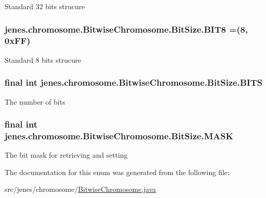 Standard 32 bits strucure \hypertarget{enumjenes_1_1chromosome_1_1_bitwise_chromosome_1_1_bit_size_a3d70a1d66121607b50d32fbf01dd3333}{
\subsubsection[{B\-I\-T8}]{\setlength{\rightskip}{0pt plus 5cm}jenes.\-chromosome.\-Bitwise\-Chromosome.\-Bit\-Size.\-B\-I\-T8 =(8, 0x\-F\-F)}}\label{enumjenes_1_1chromosome_1_1_bitwise_chromosome_1_1_bit_size_a3d70a1d66121607b50d32fbf01dd3333}
Standard 8 bits strucure \hypertarget{enumjenes_1_1chromosome_1_1_bitwise_chromosome_1_1_bit_size_a83754d4cd40d6f7cad7e7732f2494926}{
\subsubsection[{B\-I\-T\-S}]{\setlength{\rightskip}{0pt plus 5cm}final int jenes.\-chromosome.\-Bitwise\-Chromosome.\-Bit\-Size.\-B\-I\-T\-S}}\label{enumjenes_1_1chromosome_1_1_bitwise_chromosome_1_1_bit_size_a83754d4cd40d6f7cad7e7732f2494926}
The number of bits \hypertarget{enumjenes_1_1chromosome_1_1_bitwise_chromosome_1_1_bit_size_a9566045bf22bb46793d909d09f69664b}{
\subsubsection[{M\-A\-S\-K}]{\setlength{\rightskip}{0pt plus 5cm}final int jenes.\-chromosome.\-Bitwise\-Chromosome.\-Bit\-Size.\-M\-A\-S\-K}}\label{enumjenes_1_1chromosome_1_1_bitwise_chromosome_1_1_bit_size_a9566045bf22bb46793d909d09f69664b}
The bit mask for retrieving and setting 

The documentation for this enum was generated from the following file\-:\begin{DoxyCompactItemize}
\item 
src/jenes/chromosome/\hyperlink{_bitwise_chromosome_8java}{Bitwise\-Chromosome.\-java}\end{DoxyCompactItemize}
